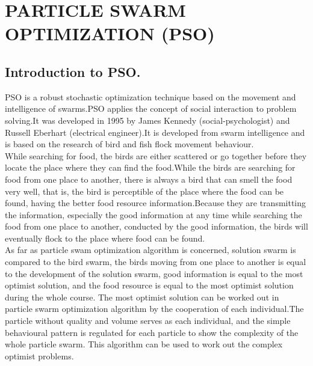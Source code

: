 \chapter{PARTICLE SWARM OPTIMIZATION (PSO)}

\section{Introduction to PSO.}PSO is a robust stochastic optimization technique based on the movement and intelligence of swarms.PSO applies the concept of social interaction to problem solving.It was developed in 1995 by James Kennedy (social-psychologist) and Russell Eberhart (electrical engineer).It is developed from swarm intelligence and is based on the research of bird and fish flock movement behaviour.\\
While searching for food, the birds are either scattered or go together before they locate the place where they can find the food.While the birds are searching for food from one place to another, there is always a bird that can smell the food very well, that is, the bird is perceptible of the place where the food can be found, having the better food resource information.Because they are transmitting the information, especially the good information at any time while searching the food from one place to another, conducted by the good information, the birds will eventually flock to the place where food can be found.\\
As far as particle swam optimization algorithm is concerned, solution swarm is compared to the bird swarm, the birds moving from one place to another is equal to the development of the solution swarm, good information is equal to the most optimist solution, and the food resource is equal to the most optimist solution during the whole course. The most optimist solution can be worked out in particle swarm optimization algorithm by the cooperation of each individual.The particle without quality and volume serves as each individual, and the simple behavioural pattern is regulated for each particle to show the complexity of the whole particle swarm. This algorithm can be used to work out the complex optimist problems.\\
